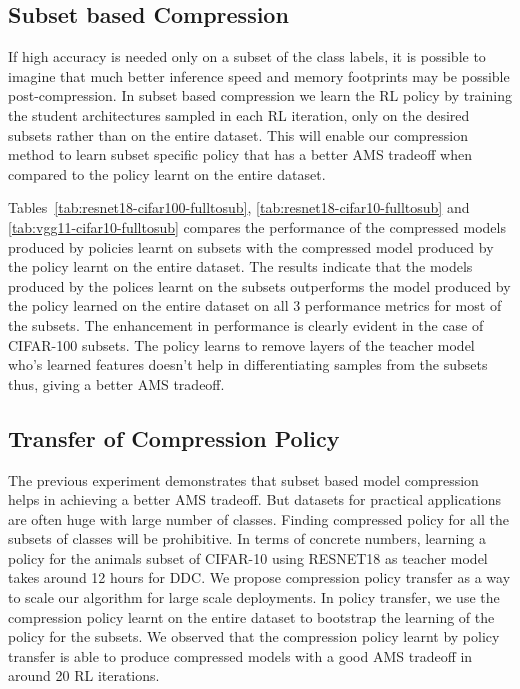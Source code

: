 \documentclass[../main]{subfiles}
\begin{document}
    \subsection{Subset based Compression}
        \label{sec:subset}
        
        
        
        If high accuracy is needed only on a subset of the class labels, it is possible to imagine that much better inference speed and memory footprints may be possible post-compression.
        In subset based compression we learn the RL policy by training the student architectures sampled in each RL iteration, only on the desired subsets rather than on the entire dataset.
        This will enable our compression method to learn subset specific policy that has a better AMS tradeoff when compared to the policy learnt on the entire dataset.
        
        Tables~\ref{tab:resnet18-cifar100-fulltosub}, \ref{tab:resnet18-cifar10-fulltosub} and \ref{tab:vgg11-cifar10-fulltosub} compares the performance of the compressed models produced by policies learnt on subsets with the compressed model produced by the policy learnt on the entire dataset.
        The results indicate that the models produced by the polices learnt on the subsets outperforms the model produced by the policy learned on the entire dataset on all 3 performance metrics for most of the subsets.
        The enhancement in performance is clearly evident in the case of CIFAR-100 subsets.
        The policy learns to remove layers of the teacher model who's learned features doesn't help in differentiating samples from the subsets thus, giving a better AMS tradeoff.
    
    \subsection{Transfer of Compression Policy}
    \label{sec:poltrans}
        The previous experiment demonstrates that subset based model compression helps in achieving a better AMS tradeoff.
        But datasets for practical applications are often huge with large number of classes.
        Finding compressed policy for all the subsets of classes will be prohibitive.
        In terms of concrete numbers, learning a policy for the animals subset of CIFAR-10 using RESNET18 as teacher model takes around 12 hours for DDC.
        We propose compression policy transfer as a way to scale our algorithm for large scale deployments.
        In policy transfer, we use the compression policy learnt on the entire dataset to bootstrap the learning of the policy for the subsets.
        We observed that the compression policy learnt by policy transfer is able to produce compressed models with a good AMS tradeoff in around 20 RL iterations.
        
        
        
        
\end{document}
